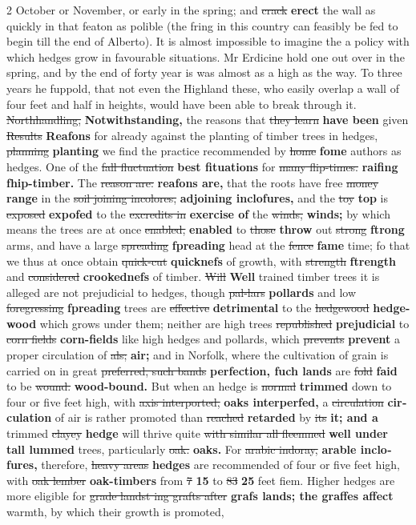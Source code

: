 \documentclass[10pt]{article}
\begin{document}
\begin{multicols}{2}
October or November, or early in the spring; and \sout{crack} \textbf{erect} the wall as quickly in that featon as polible (the fring in this country can feasibly be fed to begin till the end of Alberto). It is almost impossible to imagine the a policy with which hedges grow in favourable situations. Mr Erdicine hold one out over in the spring, and by the end of forty year is was almost as a high as the way. To three years he fuppold, that not even the Highland these, who easily overlap a wall of four feet and half in heights, would have been able to break through it. \sout{Northhandling,} \textbf{Notwithstanding,} the reasons that \sout{they learn} \textbf{have been} given \sout{Results} \textbf{Reafons} for already against the planting of timber trees in hedges, \sout{planning} \textbf{planting} we find the practice recommended by \sout{home} \textbf{fome} authors as hedges. One of the \sout{fall fluctuation} \textbf{best fituations} for \sout{many flip-times.} \textbf{raifing fhip-timber.} The \sout{reason are:} \textbf{reafons are,} that the roots have free \sout{money} \textbf{range} in the \sout{soil joining incolores,} \textbf{adjoining inclofures,} and the \sout{toy} \textbf{top} is \sout{exposed} \textbf{expofed} to the \sout{excredits in} \textbf{exercise of} the \sout{winds,} \textbf{winds;} by which means the trees are at once \sout{enabled,} \textbf{enabled} to \sout{those} \textbf{throw} out \sout{strong} \textbf{ftrong} arms, and have a large \sout{spreading} \textbf{fpreading} head at the \sout{fence} \textbf{fame} time; fo that we thus at once obtain \sout{quick-cut} \textbf{quicknefs} of growth, with \sout{strength} \textbf{ftrength} and \sout{considered} \textbf{crookednefs} of timber. \sout{Will} \textbf{Well} trained timber trees it is alleged are not prejudicial to hedges, though \sout{pal-lars} \textbf{pollards} and low \sout{foregressing} \textbf{fpreading} trees are \sout{effective} \textbf{detri­mental} to the \sout{hedgewood} \textbf{hedge-wood} which grows under them; neither are high trees \sout{republished} \textbf{prejudicial} to \sout{corn fields} \textbf{corn-fields} like high hedges and pollards, which \sout{prevents} \textbf{prevent} a proper circulation of \sout{als;} \textbf{air;} and in Norfolk, where the cultivation of grain is carried on in great \sout{preferred, such bands} \textbf{perfection, fuch lands} are \sout{fold} \textbf{faid} to be \sout{wound.} \textbf{wood-bound.} But when an hedge is \sout{normal} \textbf{trimmed} down to four or five feet high, with \sout{axis interported,} \textbf{oaks interperfed,} a \sout{circulation} \textbf{cir­culation} of air is rather promoted than \sout{reached} \textbf{retarded} by \sout{its} \textbf{it; and a} trimmed \sout{clayey} \textbf{hedge} will thrive quite \sout{with similar all fleemned} \textbf{well under tall lummed} trees, particularly \sout{oak.} \textbf{oaks.} For \sout{arabic indoray,} \textbf{arable inclo­fures,} therefore, \sout{heavy areas} \textbf{hedges} are recommended of four or five feet high, with \sout{oak lember} \textbf{oak-timbers} from \sout{7} \textbf{15} to \sout{83} \textbf{25} feet fiem. Higher hedges are more eligible for \sout{grade landst ing grafts after} \textbf{grafs lands; the graffes affect} warmth, by which their growth is promoted, 
\end{multicols}
\end{document}
